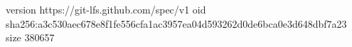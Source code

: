 version https://git-lfs.github.com/spec/v1
oid sha256:a3c530aec678e8f1fe556cfa1ac3957ea04d593262d0de6bca0e3d648dbf7a23
size 380657
